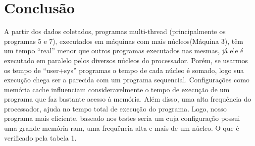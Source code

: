 \documentclass[10pt,a4paper]{article}
\begin{document}
\section{Conclusão}
A partir dos dados coletados, programas multi-thread (principalmente
os programas 5 e 7), executados em máquinas com mais núcleos(Máquina 3), têm um tempo
``real'' menor que outros programas executados nas mesmas, já ele é executado em paralelo pelos
diversos núcleos do processador. Porém, se usarmos os tempo de ``user+sys''
programas o tempo de cada núcleo é somado, logo sua execução chega ser
a parecida com um programa sequencial.
Configurações como memória cache influenciam consideravelmente o tempo de
execução de um programa que faz bastante acesso à memória. Além disso,
 uma alta frequência do processador, ajuda no tempo total de execução
do programa.
Logo, nosso programa mais eficiente, baseado nos testes seria um cuja
configuração possui uma grande memória ram, uma frequência alta e mais
de um núcleo. O que é verificado pela tabela 1.
%
%  
\end{document}

